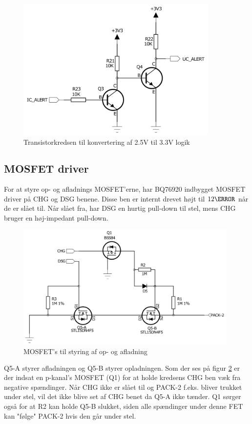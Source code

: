 \begin{figure}[h]
	\centering
	\includegraphics[width=10cm]{billeder/bq_npn_conv.png}
	\caption{Transistorkredsen til konvertering af 2.5V til 3.3V logik}
	\label{fig:bq_npn_conv}
\end{figure}

\subsection{MOSFET driver}
For at styre op- og afladnings MOSFET'erne, har BQ76920 indbygget MOSFET driver på CHG og DSG benene. Disse ben er internt drevet højt til $12\volt$ når de er slået til. Når slået fra, har DSG en hurtig pull-down til stel, mens CHG bruger en høj-impedant pull-down. 

\begin{figure}[h]
	\centering
	\includegraphics[width=11cm]{billeder/bq_fets.png}
	\caption{MOSFET's til styring af op- og afladning}
	\label{fig:bq_fets}
\end{figure}

Q5-A styrer afladningen og Q5-B styrer opladningen. Som der ses på figur \ref{fig:bq_fets} er der indsat en p-kanal's MOSFET (Q1) for at holde kredsens CHG ben væk fra negative spændinger. Når CHG ikke er slået til og PACK-2 f.eks. bliver trukket under stel, vil det ikke blive set af CHG benet da Q5-A ikke tænder. Q1 sørger også for at R2 kan holde Q5-B slukket, siden alle spændinger under denne FET kan "følge" \space PACK-2 hvis den går under stel. \\

